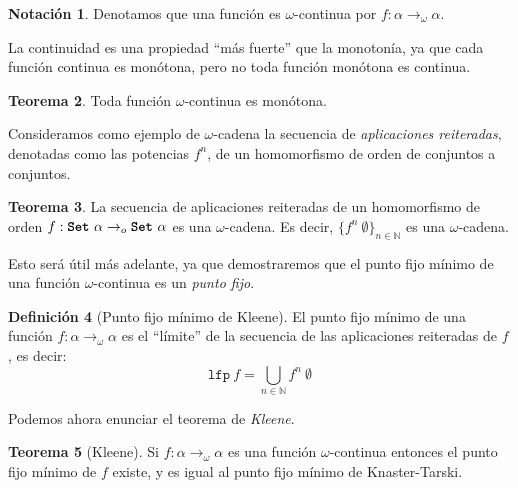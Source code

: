 \documentclass[
  a4paper, 
  10pt, 
  parskip=half, 
  toc=bibliography,
]{scrbook}
\theoremstyle{definition}
\theoremstyle{bolddef}
\newtheorem{theorem}{Teorema}[section]
\newtheorem{definition}[theorem]{Definición}
\newtheorem{notation}[theorem]{Notación}
\newcommand{\funfont}[1]{\texttt{#1}}
\newcommand{\tyfont}[1]{\texttt{\textbf{#1}}}
\begin{document}
\begin{notation}
  Denotamos que una función es \(\omega\)-continua por \(f: \alpha \to_\omega \alpha\).
\end{notation}

La continuidad es una propiedad \enquote{más fuerte} que la monotonía, ya que
cada función continua es monótona, pero no toda función monótona es continua.

\begin{theorem}
  Toda función \(\omega\)-continua es monótona.
\end{theorem}

Consideramos como ejemplo de \(\omega\)-cadena la secuencia de \emph{aplicaciones reiteradas},
denotadas como las potencias \(f^n\),
de un homomorfismo de orden de conjuntos a conjuntos.

\begin{theorem}\label{thm:fpow_chain}
  La secuencia de aplicaciones reiteradas de un homomorfismo de orden \(f: \tyfont{Set} \ \alpha \to_o \tyfont{Set} \ \alpha\)
  es una \(\omega\)-cadena. Es decir, \({\{f^n \ \emptyset\}}_{n \in \mathbb{N}}\) es una \(\omega\)-cadena.
\end{theorem}

Esto será útil más adelante, ya que demostraremos que el punto fijo mínimo de una función
\(\omega\)-continua es un \emph{punto fijo}.

\begin{definition}[Punto fijo mínimo de Kleene]
  El punto fijo mínimo de una función \(f: \alpha \to_\omega \alpha\) es el
  \enquote{límite} de la secuencia de las aplicaciones reiteradas de \(f\), es decir:
  \[
    \funfont{lfp} \ f = \bigcup_{n \in \mathbb{N}} f^n \ \emptyset
  \]
\end{definition}

Podemos ahora enunciar el teorema de \emph{Kleene}.

\begin{theorem}[Kleene]
  Si \(f: \alpha \to_\omega \alpha\) es una función \(\omega\)-continua
  entonces el punto fijo mínimo de \(f\) existe, y es igual al punto fijo mínimo
  de Knaster-Tarski.
\end{theorem}
\end{document}
